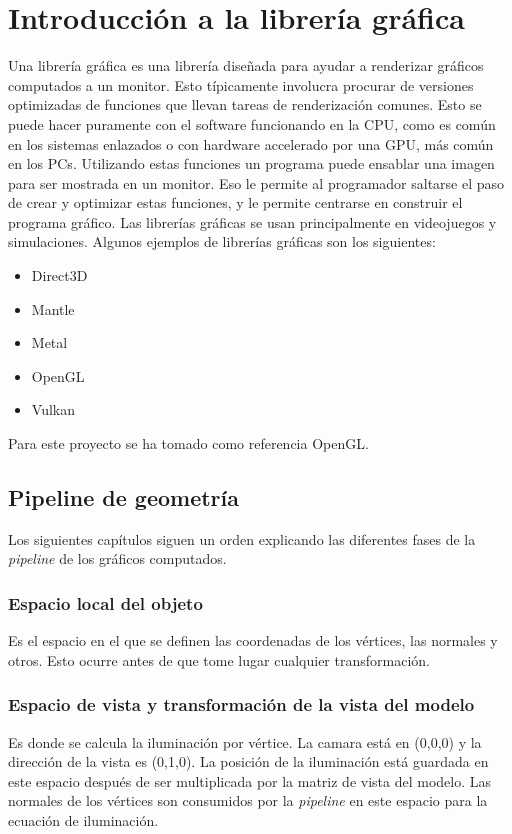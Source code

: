 \chapter{Introducción a la librería gráfica}
Una librería gráfica es una librería diseñada para ayudar a renderizar gráficos computados a un monitor. Esto típicamente involucra procurar de versiones optimizadas de funciones que llevan tareas de renderización comunes. Esto se puede hacer puramente con el software funcionando en la CPU, como es común en los sistemas enlazados o con hardware accelerado por una GPU, más común en los PCs. Utilizando estas funciones un programa puede ensablar una imagen para ser mostrada en un monitor. Eso le permite al programador saltarse el paso de crear y optimizar estas funciones, y le permite centrarse en construir el programa gráfico. Las librerías gráficas se usan principalmente en videojuegos y simulaciones.
Algunos ejemplos de librerías gráficas son los siguientes:
\begin{itemize}
\item{Direct3D}
\item{Mantle}
\item{Metal}
\item{OpenGL}
\item{Vulkan}
\end{itemize}
Para este proyecto se ha tomado como referencia OpenGL.

\newpage
\section{Pipeline de geometría}
Los siguientes capítulos siguen un orden explicando las diferentes fases de la \textit{pipeline} de los gráficos computados.
\subsection{Espacio local del objeto}
Es el espacio en el que se definen las coordenadas de los vértices, las normales y otros. Esto ocurre antes de que tome lugar cualquier transformación.
\subsection{Espacio de vista y transformación de la vista del modelo}
Es donde se calcula la iluminación por vértice. La camara está en (0,0,0) y la dirección de la vista es (0,1,0). La posición de la iluminación está guardada en este espacio después de ser multiplicada por la matriz de vista del modelo. Las normales de los vértices son consumidos por la \textit{pipeline} en este espacio para la ecuación de iluminación.
